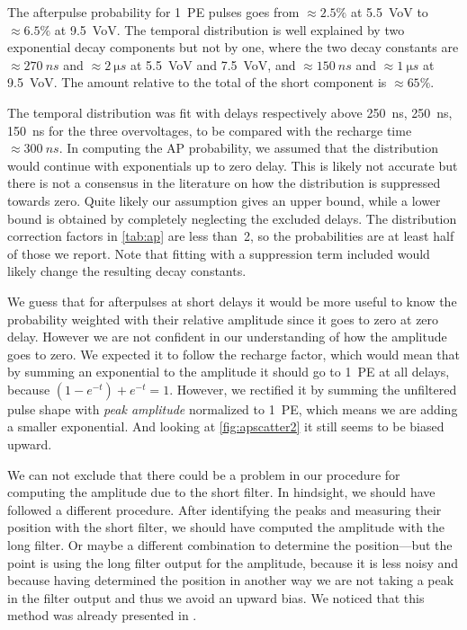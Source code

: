 The afterpulse probability for 1~PE pulses goes from $\approx\SI{2.5}\%$ at
\SI{5.5}{VoV} to $\approx\SI{6.5}\%$ at \SI{9.5}{VoV}. The temporal
distribution is well explained by two exponential decay components but not by
one, where the two decay constants are $\approx\SI{270}{ns}$ and
$\approx\SI{2}{\micro s}$ at \SI{5.5}{VoV} and \SI{7.5}{VoV}, and
$\approx\SI{150}{ns}$ and $\approx\SI{1}{\micro s}$ at \SI{9.5}{VoV}. The
amount relative to the total of the short component is $\approx\SI{65}\%$.

The temporal distribution was fit with delays respectively above \SI{250}{ns},
\SI{250}{ns}, \SI{150}{ns} for the three overvoltages, to be compared with the
recharge time $\approx\SI{300}{ns}$. In computing the AP probability, we
assumed that the distribution would continue with exponentials up to zero
delay. This is likely not accurate but there is not a consensus in the
literature on how the distribution is suppressed towards zero. Quite likely our
assumption gives an upper bound, while a lower bound is obtained by completely
neglecting the excluded delays. The distribution correction factors in
\autoref{tab:ap} are less than~2, so the probabilities are at least half of
those we report. Note that fitting with a suppression term included would
likely change the resulting decay constants.

We guess that for afterpulses at short delays it would be more useful to know
the probability weighted with their relative amplitude since it goes to zero at
zero delay. However we are not confident in our understanding of how the
amplitude goes to zero. We expected it to follow the recharge factor, which
would mean that by summing an exponential to the amplitude it should go to 1~PE
at all delays, because $(1-e^{-t})+e^{-t} = 1$. However, we rectified it by
summing the unfiltered pulse shape with \emph{peak amplitude} normalized to
1~PE, which means we are adding a smaller exponential. And looking at
\autoref{fig:apscatter2} it still seems to be biased upward.

We can not exclude that there could be a problem in our procedure for computing
the amplitude due to the short filter. In hindsight, we should have followed a
different procedure. After identifying the peaks and measuring their position
with the short filter, we should have computed the amplitude with the long
filter. Or maybe a different combination to determine the position---but the
point is using the long filter output for the amplitude, because it is less
noisy and because having determined the position in another way we are not
taking a peak in the filter output and thus we avoid an upward bias. We noticed
that this method was already presented in \cite{krikler2020}.


